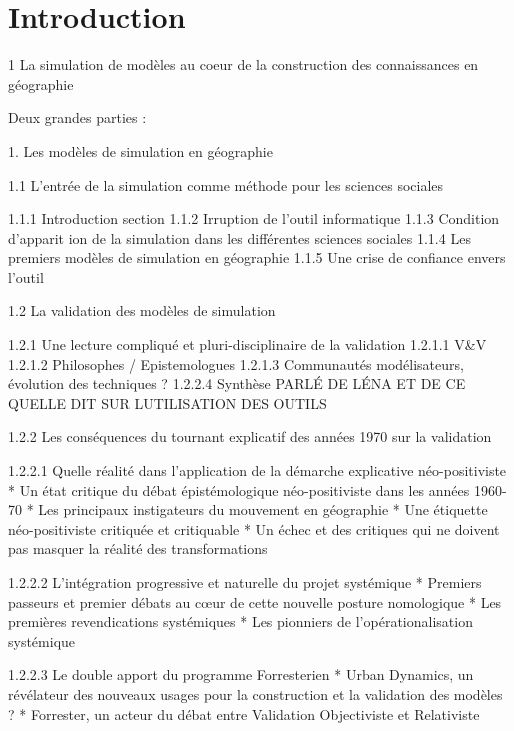 
\chapter{Introduction}

\startcontents[chapters]
\Mprintcontents


1 La simulation de modèles au coeur de la construction des connaissances en géographie

Deux grandes parties : 

1. Les modèles de simulation en géographie

1.1 L'entrée de la simulation comme méthode pour les sciences sociales
	
	1.1.1 Introduction section
	1.1.2 Irruption de l'outil informatique
	1.1.3 Condition d'apparit\tabularnewline
	ion de la simulation dans les différentes sciences sociales
	1.1.4 Les premiers modèles de simulation en géographie
	1.1.5 Une crise de confiance envers l'outil

1.2 La validation des modèles de simulation

	1.2.1 Une lecture compliqué et pluri-disciplinaire de la validation
			1.2.1.1 V&V
			1.2.1.2 Philosophes / Epistemologues
			1.2.1.3 Communautés modélisateurs, évolution des techniques
				?
			1.2.2.4 Synthèse
			PARLÉ DE LÉNA ET DE CE QUELLE DIT SUR LUTILISATION DES OUTILS

	1.2.2 Les conséquences du tournant explicatif des années 1970 sur la validation

		1.2.2.1 Quelle réalité dans l'application de la démarche explicative néo-positiviste
			* Un état critique du débat épistémologique néo-positiviste dans les années 1960-70
			* Les principaux instigateurs du mouvement en géographie
			* Une étiquette néo-positiviste critiquée et critiquable
			* Un échec et des critiques qui ne doivent pas masquer la réalité des transformations

		1.2.2.2 L'intégration progressive et naturelle du projet systémique
			* Premiers passeurs et premier débats au cœur de cette nouvelle posture nomologique
			* Les premières revendications systémiques
			* Les pionniers de l'opérationalisation systémique

		1.2.2.3 Le double apport du programme Forresterien 
			* Urban Dynamics, un révélateur des nouveaux usages pour la construction et la validation des modèles ?
			* Forrester, un acteur du débat entre Validation Objectiviste et Relativiste

